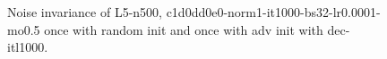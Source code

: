\begin{figure}[!ht]
  \centering
  \caption{Noise invariance of L5-n500, c1d0dd0e0-norm1-it1000-bs32-lr0.0001-mo0.5 once with random init and once with adv init with dec-itl1000.}
  \label{fig:exp_tb_noise_fc3}
\end{figure}
\FloatBarrier
\noindent